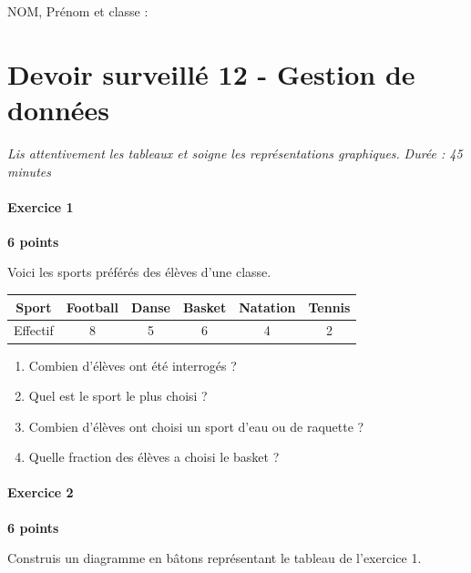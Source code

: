 \documentclass[a4paper,10pt]{report}
\begin{document}
\pagestyle{empty}
\noindent NOM, Prénom et classe : \dotfill

\section*{Devoir surveillé 12 - Gestion de données}
\noindent\textit{Lis attentivement les tableaux et soigne les représentations graphiques.} \hfill \textit{Durée : 45 minutes}

\medskip
\paragraph{Exercice 1} \hfill \textbf{6 points}

\noindent Voici les sports préférés des élèves d'une classe.

\begin{center}
\renewcommand{\arraystretch}{1.4}
\begin{tabular}{|c|c|c|c|c|c|}
\hline
Sport & Football & Danse & Basket & Natation & Tennis\\\hline
Effectif & 8 & 5 & 6 & 4 & 2\\\hline
\end{tabular}
\end{center}

\begin{enumerate}
\item Combien d'élèves ont été interrogés ?
\item Quel est le sport le plus choisi ?
\item Combien d'élèves ont choisi un sport d'eau ou de raquette ?
\item Quelle fraction des élèves a choisi le basket ?
\end{enumerate}

\medskip
\paragraph{Exercice 2} \hfill \textbf{6 points}

\noindent Construis un diagramme en bâtons représentant le tableau de l'exercice 1.

\medskip
\begin{center}
\end{center}
\end{document}
